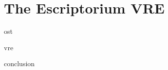 \documentclass[a4paper, 11pt]{book}
\begin{document}
\part{The Escriptorium VRE}

\begin{refsection}
{ost}
\printbibliography[heading=subbibliography,notkeyword=ost]
\end{refsection}
\cleardoublepage
\begin{refsection}
{vre}
\printbibliography[heading=subbibliography,notkeyword=vre]
\end{refsection}
\cleardoublepage
{conclusion}
\cleardoublepage
\begin{appendices}

\cleardoublepage

\end{appendices}
\end{document}
